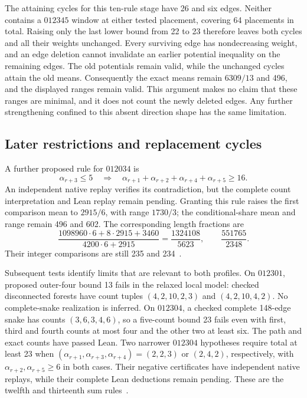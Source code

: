 \documentclass[11pt,a4paper]{article}
\theoremstyle{definition}
\theoremstyle{remark}
\begin{document}
The attaining cycles for this ten-rule stage have 26 and six edges. Neither contains a
$012345$ window at either tested placement, covering 64 placements in
total. Raising only the last lower bound from 22 to 23 therefore leaves
both cycles and all their weights unchanged. Every surviving edge has
nondecreasing weight, and an edge deletion cannot invalidate an earlier
potential inequality on the remaining edges. The old potentials remain
valid, while the unchanged cycles attain the old means. Consequently the
exact means remain $6309/13$ and 496, and the displayed ranges remain
valid. This argument makes no claim that these ranges are minimal, and
it does not count the newly deleted edges. Any further strengthening
confined to this absent direction shape has the same limitation.

\subsection{Later restrictions and replacement cycles}
A further proposed rule for $012034$ is
\[
\alpha_{r+3}\le5\quad\Longrightarrow\quad
\alpha_{r+1}+\alpha_{r+2}+\alpha_{r+4}+\alpha_{r+5}\ge16.
\]
An independent native replay verifies its contradiction, but the complete
count interpretation and Lean replay remain pending. Granting this rule
raises the first comparison mean to $2915/6$, with range $1730/3$; the
conditional-share mean and range remain 496 and 602. The corresponding
length fractions are
\[
\frac{1098960\cdot6+8\cdot2915+3460}{4200\cdot6+2915}
=\frac{1324108}{5623},\qquad \frac{551765}{2348}.
\]
Their integer comparisons are still 235 and 234~\cite{latersumarchive}.

Subsequent tests identify limits that are relevant to both profiles.
On $012301$, proposed outer-four bound 13 fails in the relaxed local model:
checked disconnected forests have count tuples $(4,2,10,2,3)$ and
$(4,2,10,4,2)$. No complete-snake realization is inferred. On $012304$, a
checked complete 148-edge snake has counts $(3,6,3,4,6)$, so a five-count
bound 23 fails even with first, third and fourth counts at most four and
the other two at least six. The path and exact counts have passed Lean.
Two narrower $012304$ hypotheses require total at least 23 when
$(\alpha_{r+1},\alpha_{r+3},\alpha_{r+4})=(2,2,3)$ or $(2,4,2)$,
respectively, with $\alpha_{r+2},\alpha_{r+5}\ge6$ in both cases.
Their negative certificates have independent native replays, while their
complete Lean deductions remain pending. These are the twelfth and
thirteenth sum rules~\cite{latersumarchive}.
\end{document}

